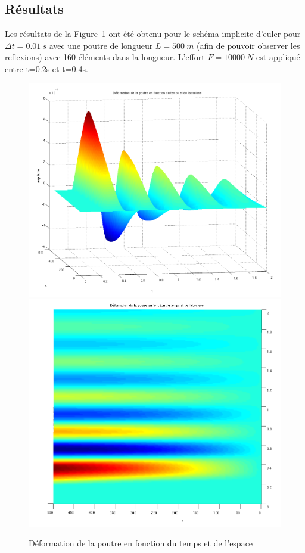 \documentclass[]{article}
\begin{document}
\subsection{Résultats}

Les résultats de la Figure~\ref{defimp} ont été obtenu pour le schéma implicite
d'euler pour $\Delta t=0.01\ s$ avec une poutre de longueur $L=500\ m$ (afin de
pouvoir observer les reflexions) avec 160 éléments dans la longueur. L'effort
$F=10000\ N$ est appliqué entre t=0.2s et t=0.4s.

\begin{figure}
\begin{center}
 \includegraphics[scale=0.2]{Figures/3D_def.png}
\includegraphics[scale=0.2]{Figures/3D_def_2.png}
\caption{Déformation de la poutre en fonction du temps et de l'espace}
\label{defimp}
\end{center}
\end{figure}
\end{document}

